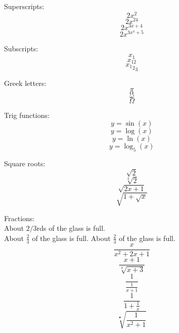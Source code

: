 \documentclass[12]{article}
\begin{document}
Superscripts: 
$$2x^2$$
$$2x^{24}$$
$$2x^{3x+4}$$
$$2x^{3x^4+5}$$

Subscripts:
$$x_1$$
$$x_{12}$$
$${{x_1}_2}_3$$

Greek letters:
$$\pi$$
$$\alpha$$
$$\omega$$
$$\Omega$$

Trig functions:
$$y=\sin(x)$$ %
$$y=\log(x)$$
$$y=\ln(x)$$
$$y=\log_5(x)$$

Square roots:
$$\sqrt{2}$$
$$\sqrt[3]{2}$$
$$\sqrt{2x+1}$$
$$\sqrt{1 + \sqrt{x}}$$

Fractions:\\
About $2/3$rds of the glass is full.\\
About $\frac{2}{3}$ of the glass is full.
About $\displaystyle\frac{2}{3}$ of the glass is full.\\
$$\frac{x}{x^2+2x+1	}$$
$$\frac{x+1}{\sqrt[3]{x+3}}$$
$$\frac{1}{\frac{1}{x+1}}$$
$$\frac{1}{1+\frac{1}{x}}$$
$$\sqrt[•]{\frac{1}{x^2+1}}$$
\end{document}
